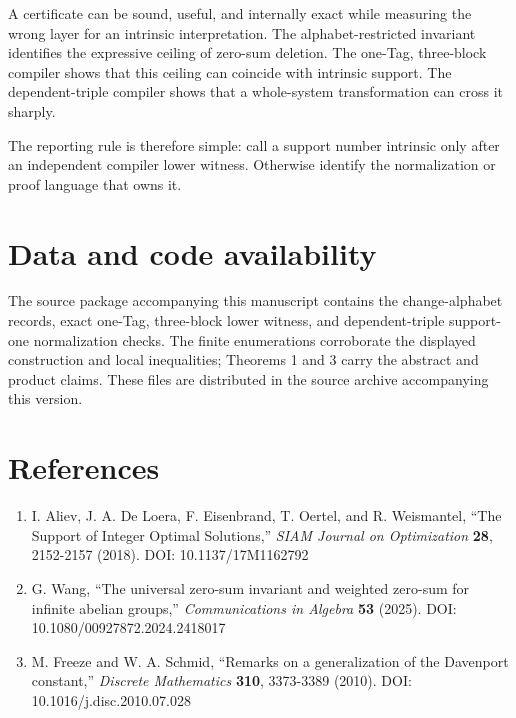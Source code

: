 \documentclass[
  11pt,
]{article}
\providecommand{\tightlist}{%
  \setlength{\itemsep}{0pt}\setlength{\parskip}{0pt}}
\begin{document}
A certificate can be sound, useful, and internally exact while measuring
the wrong layer for an intrinsic interpretation. The alphabet-restricted
invariant identifies the expressive ceiling of zero-sum deletion. The
one-Tag, three-block compiler shows that this ceiling can coincide with
intrinsic support. The dependent-triple compiler shows that a
whole-system transformation can cross it sharply.

The reporting rule is therefore simple: call a support number intrinsic
only after an independent compiler lower witness. Otherwise identify the
normalization or proof language that owns it.

\hypertarget{data-and-code-availability}{%
\section{Data and code availability}\label{data-and-code-availability}}

The source package accompanying this manuscript contains the
change-alphabet records, exact one-Tag, three-block lower witness, and
dependent-triple support-one normalization checks. The finite
enumerations corroborate the displayed construction and local
inequalities; Theorems 1 and 3 carry the abstract and product claims.
These files are distributed in the source archive accompanying this
version.

\enlargethispage{12\baselineskip}
\hypertarget{references}{%
\section{References}\label{references}}

\begin{enumerate}
\def\labelenumi{\arabic{enumi}.}
\tightlist
\item
  I. Aliev, J. A. De Loera, F. Eisenbrand, T. Oertel, and R. Weismantel,
  ``The Support of Integer Optimal Solutions,'' \emph{SIAM Journal on
  Optimization} \textbf{28}, 2152-2157 (2018). DOI: 10.1137/17M1162792
\item
  G. Wang, ``The universal zero-sum invariant and weighted zero-sum for
  infinite abelian groups,'' \emph{Communications in Algebra}
  \textbf{53} (2025). DOI: 10.1080/00927872.2024.2418017
\item
  M. Freeze and W. A. Schmid, ``Remarks on a generalization of the
  Davenport constant,'' \emph{Discrete Mathematics} \textbf{310},
  3373-3389 (2010). DOI: 10.1016/j.disc.2010.07.028
\end{enumerate}
\end{document}
